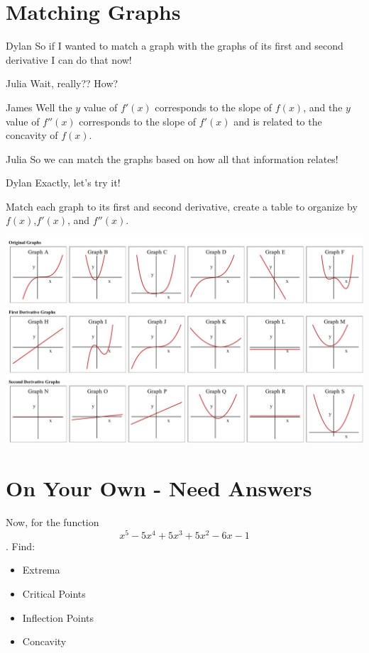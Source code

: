 \documentclass{ximera}
\begin{document}
\section{Matching Graphs}
\begin{dialogue}
\item[Dylan]So if I wanted to match a graph with the graphs of its first and second derivative I can do that now!
\item[Julia] Wait, really?? How?
\item[James] Well the $y$ value of $f'(x)$ corresponds to the slope of $f(x)$, and the $y$ value of $f''(x)$ corresponds to the slope of $f'(x)$ and is related to the concavity of $f(x)$.
\item[Julia] So we can match the graphs based on how all that information relates!
\item[Dylan] Exactly, let's try it!
\end{dialogue}
Match each graph to its first and second derivative, create a table to organize by $f(x)$,$f'(x)$, and $f''(x)$.

\begin{image}
\centering
\includegraphics{matching}
\end{image}

\section{On Your Own - Need Answers}
Now, for the function $$x^5-5x^4+5x^3+5x^2-6x-1$$. Find:
\begin{itemize}
\item{Extrema}
\item{Critical Points}
\item{Inflection Points}
\item{Concavity}
\end{itemize}
\end{document}
